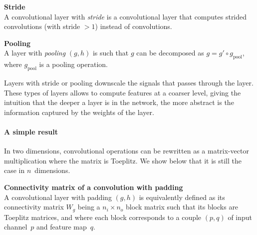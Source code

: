 \begin{definition}\textbf{Stride}\\
A convolutional layer with \emph{stride} is a convolutional layer that computes strided convolutions (with stride $> 1$) instead of convolutions.
\end{definition}

\begin{definition}\textbf{Pooling}\\
A layer with \textit{pooling} $(g,h)$ is such that $g$ can be decomposed as $g = g' \circ g_\text{pool}$, where $g_\text{pool}$ is a pooling operation.
\end{definition}

Layers with stride or pooling downscale the signals that passes through the layer. These types of layers allows to compute features at a coarser level, giving the intuition that the deeper a layer is in the network, the more abstract is the information captured by the weights of the layer.

\paragraph{A simple result}
In two dimensions, convolutional operations can be rewritten as a matrix-vector multiplication where the matrix is Toeplitz. We show below that it is still the case in $n$~dimensions.

\begin{proposition}\textbf{Connectivity matrix of a convolution with padding}\\
A convolutional layer with padding $(g, h)$ is equivalently defined as its connectivity matrix $W_g$ being a $n_i \times n_o$ block matrix such that its blocks are Toeplitz matrices, and where each block corresponds to a couple $(p,q)$ of input channel~$p$ and feature map~$q$.
\end{proposition}

